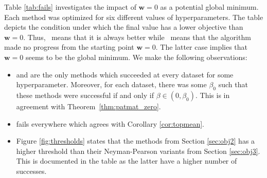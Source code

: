 Table \ref{tab:fails} investigates the impact of $\bm{w}=0$ as a potential global minimum. Each method was optimized for six different values of hyperparameters. The table depicts the condition under which the final value has a lower objective than $\bm{w}=0$. Thus, \yesmark\ means that it is always better while \nomark\ means that the algorithm made no progress from the starting point $\bm{w} =0$. The latter case implies that $\bm{w}=0$ seems to be the global minimum. We make the following observations:
\begin{itemize}
  \item \PatMat and \PatMatNP are the only methods which succeeded at every dataset for some hyperparameter. Moreover, for each dataset, there was some $\beta_0$ such that these methods were successful if and only if $\beta\in(0,\beta_0)$. This is in agreement with Theorem~\ref{thm:patmat_zero}.
  \item \TopMeanK fails everywhere which agrees with Corollary \ref{cor:topmean}.
  \item Figure \ref{fig:thresholds} states that the methods from Section \ref{sec:obj2} has a higher threshold than their Neyman-Pearson variants from Section \ref{sec:obj3}. This is documented in the table as the latter have a higher number of successes.
\end{itemize}

